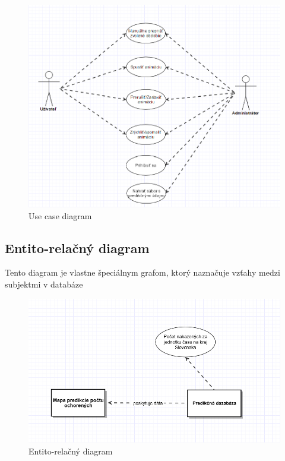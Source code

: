 \documentclass[12pt,a4paper]{report}
\begin{document}
\begin{figure}[htb]
	\centering
	\includegraphics[scale=0.6]{use_case_diagram}
	\caption{Use case diagram}
	\label{fig:Use case diagram}
\end{figure}


\FloatBarrier
\clearpage
\subsection[Entito-relačný diagram]{\rmfamily\bfseries
	Entito-relačný diagram}
Tento diagram je vlastne špeciálnym grafom, ktorý naznačuje vzťahy medzi subjektmi v databáze

\begin{figure}[htb]
	\centering
	\includegraphics[scale=0.7]{E-R_diagram}
	\caption{Entito-relačný diagram}
	\label{fig:Entito-relačný diagram}
\end{figure}

\FloatBarrier
\end{document}
